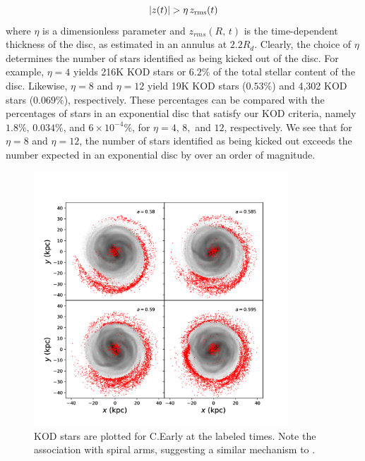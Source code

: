 \begin{equation}
|z(t)| > \eta\,z_{\rm rms}(t)\label{eq:kud_def}
\end{equation}
where $\eta$ is a dimensionless parameter and $z_{rms}(R,\,t)$ is the
time-dependent thickness of the disc, as estimated in an annulus at
$2.2R_d$. Clearly, the choice of $\eta$ determines the number of stars
identified as being kicked out of the disc. For example,
$\eta=4$ yields 216K KOD stars or $6.2\%$ of the total stellar
content of the disc. Likewise, $\eta=8$ and $\eta=12$ yield 19K KOD
stars ($0.53\%$) and 4,302 KOD stars ($0.069\%$), respectively. These
percentages can be compared with the percentages of stars in an
exponential disc that satisfy our KOD criteria, namely
$1.8\%,\,0.034\%$, and $6\times 10^{-4}\%$, for $\eta=4,\,8,$ and
$12$, respectively. We see that for $\eta=8$ and $\eta=12$, the
number of stars identified as being kicked out exceeds the number
expected in an exponential disc by over an order of magnitude.

\begin{figure}
    \centering
    \includegraphics[width=0.85\textwidth]{../figures/fiducial_halo_268824_xy_s_016.pdf}
	\caption{KOD stars are plotted for C.Early at the labeled
          times. Note the association with spiral arms, suggesting a
          similar mechanism to \citet{laporte_2019_feathers}.}
	\label{fig:xy_tidal_tail_halo_c}
\end{figure}

